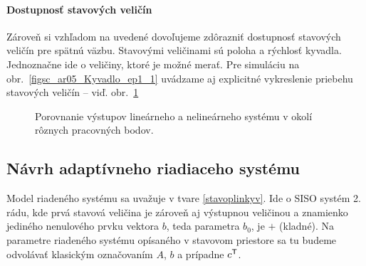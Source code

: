 \documentclass[a4paper, 10pt, ]{article}
\begin{document}






\paragraph{Dostupnosť stavových veličín}

Zároveň si vzhľadom na uvedené dovoľujeme zdôrazniť dostupnosť stavových veličín pre spätnú väzbu. Stavovými veličinami sú poloha a rýchlosť kyvadla. Jednoznačne ide o veličiny, ktoré je možné merať. Pre simuláciu na obr.~\ref{figsc_ar05_Kyvadlo_ep1_1} uvádzame aj explicitné vykreslenie priebehu stavových veličín -- viď. obr.~\ref{figsc_ar05_Kyvadlo_ep1_ss_1}






\begin{figure}[!b]
	\centering

    \vspace{-3mm}


    \vspace{-2mm}

	\caption{Porovnanie výstupov lineárneho a nelineárneho systému v okolí rôznych pracovných bodov.}
	\label{figsc_ar05_Kyvadlo_ep1_ss_1}

    \vspace{-2mm}

\end{figure}






\subsection{Návrh adaptívneho riadiaceho systému}

Model riadeného systému sa uvažuje v tvare \eqref{stavoplinkyv}. Ide o SISO systém 2. rádu, kde prvá stavová veličina je zároveň aj výstupnou veličinou a znamienko jediného nenulového prvku vektora $b$, teda parametra $b_0$, je $+$ (kladné). Na parametre riadeného systému opísaného v stavovom priestore sa tu budeme odvolávať klasickým označovaním $A$, $b$ a prípadne $c^{\mathsf{T}}$.
\end{document}
